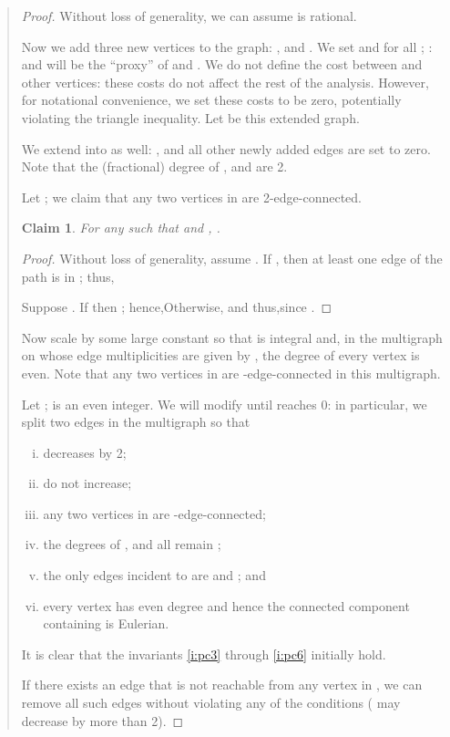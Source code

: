 \documentclass[11pt,letterpaper]{article}
\newtheorem{claim}{Claim}
\begin{document}
\begin{quote}
\begin{proof}
Without loss of generality, we can assume  is rational.

Now we add three new vertices to the graph: ,  and . We set  and  for all ; :  and  will be the ``proxy'' of  and . We do not define the cost between  and other vertices: these costs do not affect the rest of the analysis. However, for notational convenience, we set these costs to be zero, potentially violating the triangle inequality. Let  be this extended graph.

We extend  into  as well: , and all other newly added edges are set to zero. Note that the (fractional) degree of ,  and  are 2.

Let ; we claim that any two vertices in  are 2-edge-connected.
\begin{claim}\label{c:pc2}
For any  such that  and , .
\end{claim}
\begin{proof}
Without loss of generality, assume . If , then at least one edge of the path  is in ; thus,

Suppose . If  then ; hence,Otherwise,  and thus,since .
\end{proof}

Now scale  by some large constant  so that  is integral and, in the multigraph on  whose edge multiplicities are given by , the degree of every vertex is even. Note that any two vertices in  are -edge-connected in this multigraph.

Let ;  is an even integer. We will modify  until  reaches 0: in particular, we split two edges in the multigraph so that\begin{enumerate}[(i)]
\item  decreases by 2; \label{i:pc1}
\item  do not increase; \label{i:pc2}
\item any two vertices in  are -edge-connected; \label{i:pc3}
\item the degrees of ,  and  all remain ; \label{i:pc4}
\item the only edges incident to  are  and ; and \label{i:pc5}
\item every vertex has even degree and hence the connected component containing  is Eulerian. \label{i:pc6}
\end{enumerate}It is clear that the invariants \eqref{i:pc3} through \eqref{i:pc6} initially hold.

If there exists an edge that is not reachable from any vertex in , we can remove all such edges without violating any of the conditions ( may decrease by more than 2).


\end{proof}
\end{quote}
\end{document}
